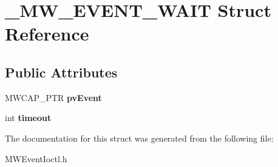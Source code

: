 \hypertarget{struct__MW__EVENT__WAIT}{\section{\-\_\-\-M\-W\-\_\-\-E\-V\-E\-N\-T\-\_\-\-W\-A\-I\-T Struct Reference}
\label{struct__MW__EVENT__WAIT}
}
\subsection*{Public Attributes}
\begin{DoxyCompactItemize}
\item 
\hypertarget{struct__MW__EVENT__WAIT_a2cc06e7ec53ea4884a607c3e4f1e8552}{M\-W\-C\-A\-P\-\_\-\-P\-T\-R {\bfseries pv\-Event}}\label{struct__MW__EVENT__WAIT_a2cc06e7ec53ea4884a607c3e4f1e8552}

\item 
\hypertarget{struct__MW__EVENT__WAIT_a5c8beb57d425da1dafaaa575005a4a1c}{int {\bfseries timeout}}\label{struct__MW__EVENT__WAIT_a5c8beb57d425da1dafaaa575005a4a1c}

\end{DoxyCompactItemize}


The documentation for this struct was generated from the following file\-:\begin{DoxyCompactItemize}
\item 
M\-W\-Event\-Ioctl.\-h\end{DoxyCompactItemize}
